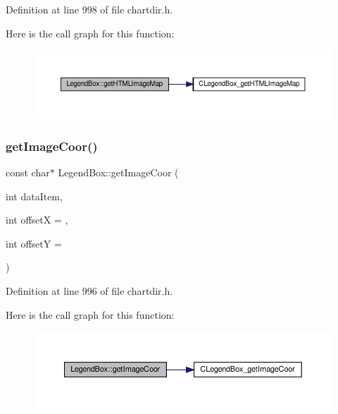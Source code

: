 Definition at line 998 of file chartdir.\+h.

Here is the call graph for this function\+:
\nopagebreak
\begin{figure}[H]
\begin{center}
\leavevmode
\includegraphics[width=350pt]{class_legend_box_ad1f44b3f7ccb3b59314d18c2ae2d0209_cgraph}
\end{center}
\end{figure}
\mbox{\label{class_legend_box_acc3a9bbda2af9ad4259e1e47c709cf6b}} 
\subsubsection{\texorpdfstring{get\+Image\+Coor()}{getImageCoor()}}
{\footnotesize\ttfamily const char$\ast$ Legend\+Box\+::get\+Image\+Coor (\begin{DoxyParamCaption}\item[{int}]{data\+Item,  }\item[{int}]{offsetX = {},  }\item[{int}]{offsetY = {} }\end{DoxyParamCaption})\hspace{0.3cm}{\ttfamily [inline]}}



Definition at line 996 of file chartdir.\+h.

Here is the call graph for this function\+:
\nopagebreak
\begin{figure}[H]
\begin{center}
\leavevmode
\includegraphics[width=350pt]{class_legend_box_acc3a9bbda2af9ad4259e1e47c709cf6b_cgraph}
\end{center}
\end{figure}
\mbox{\label{class_legend_box_a5220b13f9c7b5f3b9d0d8eaa9cfe6c25}} 
